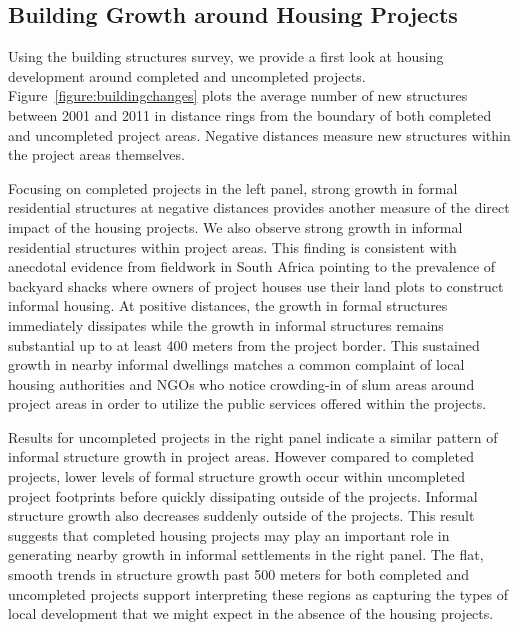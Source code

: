 \documentclass[12pt]{article}
\begin{document}




\subsection{Building Growth around Housing Projects}

Using the building structures survey, we provide a first look at housing development around completed and uncompleted projects.  Figure~\ref{figure:buildingchanges} plots the average number of new structures between 2001 and 2011 in distance rings from the boundary of both completed and uncompleted project areas.  Negative distances measure new structures within the project areas themselves.  

Focusing on completed projects in the left panel, strong growth in formal residential structures at negative distances provides another measure of the direct impact of the housing projects.  We also observe strong growth in informal residential structures within project areas.  This finding is consistent with anecdotal evidence from fieldwork in South Africa pointing to the prevalence of backyard shacks where owners of project houses use their land plots to construct informal housing.  At positive distances, the growth in formal structures immediately dissipates while the growth in informal structures remains substantial up to at least 400 meters from the project border.  This sustained growth in nearby informal dwellings matches a common complaint of local housing authorities and NGOs who notice crowding-in of slum areas around project areas in order to utilize the public services offered within the projects.  	

Results for uncompleted projects in the right panel indicate a similar pattern of informal structure growth in project areas.  However compared to completed projects, lower levels of formal structure growth occur within uncompleted project footprints before quickly dissipating outside of the projects.  Informal structure growth also decreases suddenly outside of the projects.  This result suggests that completed housing projects may play an important role in generating nearby growth in informal settlements in the right panel.  The flat, smooth trends in structure growth past 500 meters for both completed and uncompleted projects support interpreting these regions as capturing the types of local development that we might expect in the absence of the housing projects.
\end{document}
